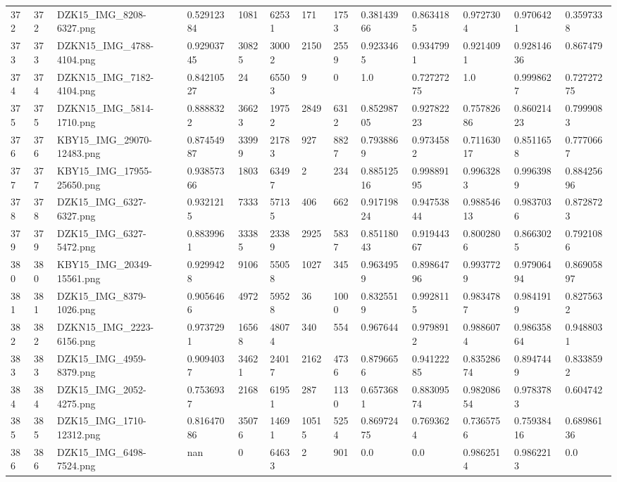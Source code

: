 \documentclass[11pt, a4paper, twoside]{report}
\begin{document}
\begin{longtable}[c]{@{}lllllllllllll@{}}
372 & 372 & DZK15\_IMG\_8208-6327.png & 0.52912384 & 1081 & 62531 & 171 & 1753 & 0.38143966 & 0.8634185 & 0.9727304 & 0.9706421 & 0.3597338 \\
373 & 373 & DZKN15\_IMG\_4788-4104.png & 0.92903745 & 30825 & 30002 & 2150 & 2559 & 0.9233465 & 0.9347991 & 0.9214091 & 0.92814636 & 0.867479 \\
374 & 374 & DZKN15\_IMG\_7182-4104.png & 0.84210527 & 24 & 65503 & 9 & 0 & 1.0 & 0.72727275 & 1.0 & 0.9998627 & 0.72727275 \\
375 & 375 & DZKN15\_IMG\_5814-1710.png & 0.8888322 & 36623 & 19752 & 2849 & 6312 & 0.85298705 & 0.92782223 & 0.75782686 & 0.86021423 & 0.7999083 \\
376 & 376 & KBY15\_IMG\_29070-12483.png & 0.87454987 & 33999 & 21783 & 927 & 8827 & 0.7938869 & 0.9734582 & 0.71163017 & 0.8511658 & 0.7770667 \\
377 & 377 & KBY15\_IMG\_17955-25650.png & 0.93857366 & 1803 & 63497 & 2 & 234 & 0.88512516 & 0.99889195 & 0.9963283 & 0.9963989 & 0.88425696 \\
378 & 378 & DZK15\_IMG\_6327-6327.png & 0.9321215 & 7333 & 57135 & 406 & 662 & 0.91719824 & 0.94753844 & 0.98854613 & 0.9837036 & 0.8728723 \\
379 & 379 & DZK15\_IMG\_6327-5472.png & 0.8839961 & 33385 & 23389 & 2925 & 5837 & 0.85118043 & 0.91944367 & 0.8002806 & 0.8663025 & 0.7921086 \\
380 & 380 & KBY15\_IMG\_20349-15561.png & 0.9299428 & 9106 & 55058 & 1027 & 345 & 0.9634959 & 0.89864796 & 0.9937729 & 0.97906494 & 0.86905897 \\
381 & 381 & DZK15\_IMG\_8379-1026.png & 0.9056466 & 4972 & 59528 & 36 & 1000 & 0.8325519 & 0.9928115 & 0.9834787 & 0.9841919 & 0.8275632 \\
382 & 382 & DZKN15\_IMG\_2223-6156.png & 0.9737291 & 16568 & 48074 & 340 & 554 & 0.967644 & 0.9798912 & 0.9886074 & 0.98635864 & 0.9488031 \\
383 & 383 & DZK15\_IMG\_4959-8379.png & 0.9094037 & 34621 & 24017 & 2162 & 4736 & 0.8796656 & 0.94122285 & 0.83528674 & 0.8947449 & 0.8338592 \\
384 & 384 & DZK15\_IMG\_2052-4275.png & 0.7536937 & 2168 & 61951 & 287 & 1130 & 0.6573681 & 0.88309574 & 0.98208654 & 0.9783783 & 0.604742 \\
385 & 385 & DZK15\_IMG\_1710-12312.png & 0.81647086 & 35076 & 14691 & 10515 & 5254 & 0.86972475 & 0.7693624 & 0.7365756 & 0.75938416 & 0.68986136 \\
386 & 386 & DZK15\_IMG\_6498-7524.png & nan & 0 & 64633 & 2 & 901 & 0.0 & 0.0 & 0.9862514 & 0.9862213 & 0.0 \\

\end{longtable}
\end{document}

